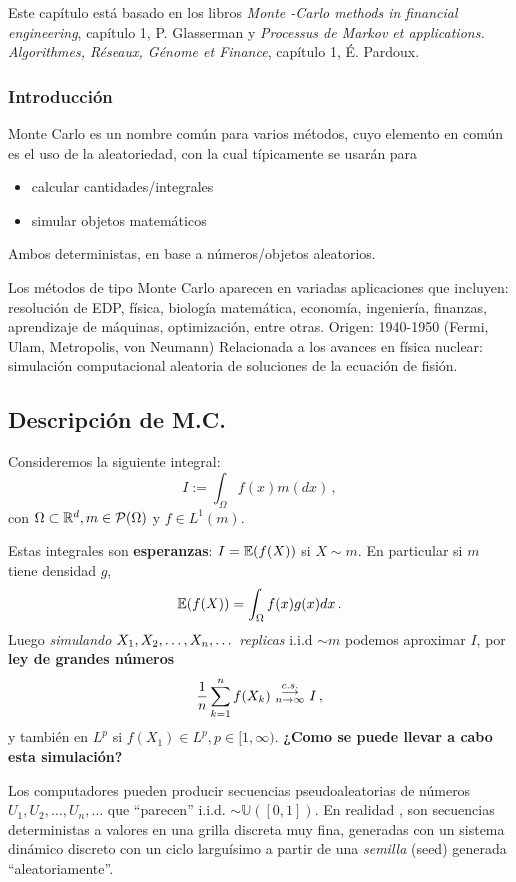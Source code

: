 Este capítulo está basado en los libros \textit{Monte -Carlo methods in financial engineering}, capítulo 1, P. Glasserman \cite{glass} y \textit{Processus de Markov et applications. Algorithmes, Réseaux, Génome et Finance}, capítulo 1, É. Pardoux\cite{pardoux}.
\subsubsection{Introducción}
Monte Carlo es un nombre común para varios métodos, cuyo elemento en común es el uso de la aleatoriedad, con la cual típicamente se usarán para  %
\begin{itemize}
    \item calcular cantidades/integrales
    \item simular objetos matemáticos
\end{itemize}
Ambos deterministas, en base a números/objetos aleatorios.

\newp Los métodos de tipo Monte Carlo aparecen en variadas aplicaciones que incluyen: resolución de EDP, física, biología matemática, economía, ingeniería, finanzas, aprendizaje de máquinas, optimización, entre otras.
\newp Origen: 1940-1950 (Fermi, Ulam, Metropolis, von Neumann) Relacionada a los avances en física nuclear: simulación computacional aleatoria de soluciones de la ecuación de fisión. 
\subsection{Descripción de M.C.}
\newp Consideremos la siguiente integral:
$$ I:=\displaystyle\int_\Omega f(x)m(dx) \, ,$$
con $\Omega\subset\mathbb{R}^d,m\in\mathcal{P}(\Omega)$ y $f\in L^1(m)$.

Estas integrales son \textbf{esperanzas}: $I=\mathbb{E}(f(X))$ si $X\sim m$.
En particular si $m$ tiene densidad $g$,
$$ \mathbb{E}(f(X)) = \displaystyle \int_\Omega f(x)g(x)dx \, .$$
Luego \textit{simulando} $X_1,X_2,\dots,X_n,\dots$ \textit{replicas} i.i.d $\sim m$ podemos aproximar $I$, por \textbf{ley de grandes números}
$$ \displaystyle\frac{1}{n}\sum^n_{k=1}f(X_k)\mbox{ }\overset{c.s.}{\substack{\longrightarrow \\n \to \infty}}\mbox{ } I \, ,$$
y también en $L^p$ si $f(X_1)\in L^p, p\in[1,\infty)$.
\newp \textbf{¿Como se puede llevar a cabo esta simulación?}

Los computadores pueden producir secuencias pseudoaleatorias de números $U_1,U_2,\dots,U_n,\dots$ que ``parecen'' i.i.d. $\sim \mathbb{U}([0,1])$. En realidad , son secuencias deterministas a valores en una grilla discreta muy fina, generadas con un sistema dinámico discreto con un ciclo larguísimo a partir de una \textit{semilla} (seed) generada ``aleatoriamente''.

